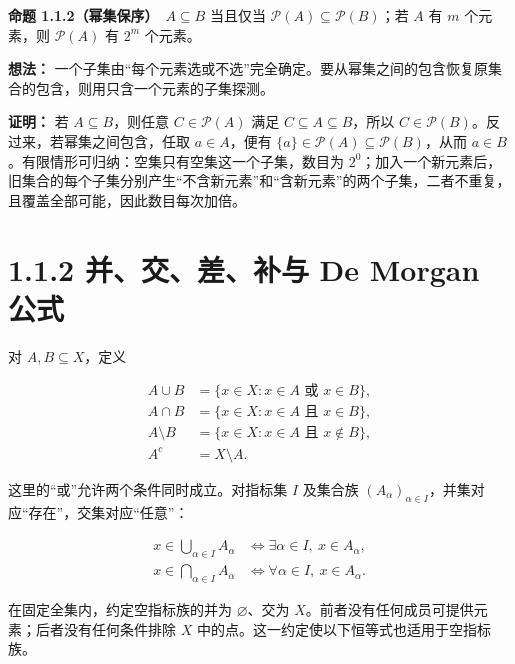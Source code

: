 \documentclass[11pt,a4paper]{article}
\begin{document}
\textbf{命题 1.1.2（幂集保序）}　\(A\subseteq B\) 当且仅当
\(\mathcal P(A)\subseteq\mathcal P(B)\)；若 \(A\) 有 \(m\) 个元素，则
\(\mathcal P(A)\) 有 \(2^m\) 个元素。

\textbf{想法：}
一个子集由``每个元素选或不选''完全确定。要从幂集之间的包含恢复原集合的包含，则用只含一个元素的子集探测。

\textbf{证明：} 若 \(A\subseteq B\)，则任意 \(C\in\mathcal P(A)\) 满足
\(C\subseteq A\subseteq B\)，所以
\(C\in\mathcal P(B)\)。反过来，若幂集之间包含，任取 \(a\in A\)，便有
\(\{a\}\in\mathcal P(A)\subseteq\mathcal P(B)\)，从而
\(a\in B\)。有限情形可归纳：空集只有空集这一个子集，数目为
\(2^0\)；加入一个新元素后，旧集合的每个子集分别产生``不含新元素''和``含新元素''的两个子集，二者不重复，且覆盖全部可能，因此数目每次加倍。

\section[\S{}1.1.2 并、交、差、补与 De Morgan
公式]{1.1.2 并、交、差、补与 De Morgan
公式}\label{ux5e76ux4ea4ux5deeux8865ux4e0e-de-morgan-ux516cux5f0f}

对 \(A,B\subseteq X\)，定义

\begin{equation*}
\begin{aligned}
A\cup B&=\{x\in X:x\in A\text{ 或 }x\in B\},\\
A\cap B&=\{x\in X:x\in A\text{ 且 }x\in B\},\\
A\setminus B&=\{x\in X:x\in A\text{ 且 }x\notin B\},\\
A^c&=X\setminus A.
\end{aligned}\tag{1.1.1}
\end{equation*}

这里的``或''允许两个条件同时成立。对指标集 \(I\) 及集合族
\((A_\alpha)_{\alpha\in I}\)，并集对应``存在''，交集对应``任意''：

\begin{equation*}
\begin{aligned}
x\in\bigcup_{\alpha\in I}A_\alpha
&\iff \exists\alpha\in I,\ x\in A_\alpha,\\
x\in\bigcap_{\alpha\in I}A_\alpha
&\iff \forall\alpha\in I,\ x\in A_\alpha.
\end{aligned}\tag{1.1.2}
\end{equation*}

在固定全集内，约定空指标族的并为 \(\varnothing\)、交为
\(X\)。前者没有任何成员可提供元素；后者没有任何条件排除 \(X\)
中的点。这一约定使以下恒等式也适用于空指标族。
\end{document}
